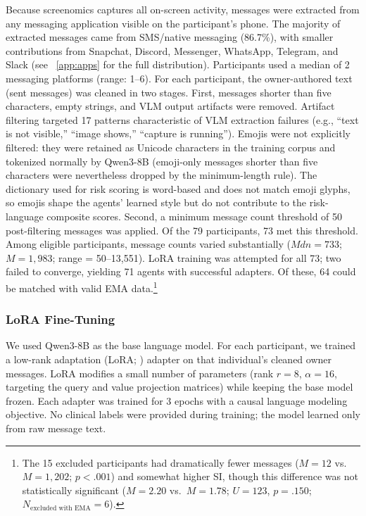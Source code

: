 \documentclass[review,12pt,authoryear]{elsarticle}
\begin{document}
Because screenomics captures all on-screen activity, messages were extracted from any messaging application visible on the participant's phone. The majority of extracted messages came from SMS/native messaging (86.7\%), with smaller contributions from Snapchat, Discord, Messenger, WhatsApp, Telegram, and Slack (see ~\ref{app:apps} for the full distribution). Participants used a median of 2 messaging platforms (range: 1--6). For each participant, the owner-authored text (sent messages) was cleaned in two stages. First, messages shorter than five characters, empty strings, and VLM output artifacts were removed. Artifact filtering targeted 17 patterns characteristic of VLM extraction failures (e.g., ``text is not visible,'' ``image shows,'' ``capture is running''). Emojis were not explicitly filtered: they were retained as Unicode characters in the training corpus and tokenized normally by Qwen3-8B (emoji-only messages shorter than five characters were nevertheless dropped by the minimum-length rule). The dictionary used for risk scoring is word-based and does not match emoji glyphs, so emojis shape the agents' learned style but do not contribute to the risk-language composite scores. Second, a minimum message count threshold of 50 post-filtering messages was applied. Of the 79 participants, 73 met this threshold. Among eligible participants, message counts varied substantially ($Mdn = 733$; $M = 1{,}983$; range = 50--13,551). LoRA training was attempted for all 73; two failed to converge, yielding 71 agents with successful adapters. Of these, 64 could be matched with valid EMA data.\footnote{The 15 excluded participants had dramatically fewer messages ($M = 12$ vs.\ $M = 1{,}202$; $p < .001$) and somewhat higher SI, though this difference was not statistically significant ($M = 2.20$ vs.\ $M = 1.78$; $U = 123$, $p = .150$; $N_{\text{excluded with EMA}} = 6$).}

\subsubsection{LoRA Fine-Tuning}

We used Qwen3-8B \citep{qwen2025qwen3} as the base language model. For each participant, we trained a low-rank adaptation (LoRA; \citealt{hu2022lora}) adapter on that individual's cleaned owner messages. LoRA modifies a small number of parameters (rank $r = 8$, $\alpha = 16$, targeting the query and value projection matrices) while keeping the base model frozen. Each adapter was trained for 3 epochs with a causal language modeling objective. No clinical labels were provided during training; the model learned only from raw message text.
\end{document}
